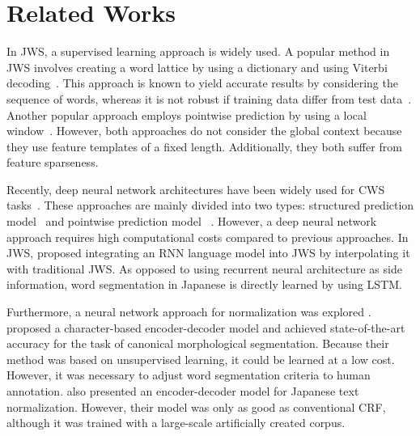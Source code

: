 \documentclass[11pt]{article}
\begin{document}
\section{Related Works}
\label{sec:relatedworks}
In JWS, a supervised learning approach is widely used. A popular method in JWS
involves creating a word lattice by using a dictionary and using Viterbi
decoding~\cite{kudo-yamamoto-matsumoto:2004:EMNLP,sassano2002empirical}. This
approach is known to yield accurate results by considering the sequence of
words, whereas it is not robust if training data differ from test
data~\cite{neubig-nakata-mori:2011:ACL-HLT2011}.
Another popular approach employs pointwise prediction by using a local
window~\cite{neubig-nakata-mori:2011:ACL-HLT2011,NEUBIG10.408}. However, both
approaches do not consider the global context because they use feature
templates of a fixed length. Additionally, they both suffer from feature
sparseness.

Recently, deep neural network architectures have been widely used for CWS
tasks~\cite{chen-EtAl:2015:EMNLP2,chen-EtAl:2015:ACL-IJCNLP5,pei-ge-chang:2014:P14-1,zhang-zhang-fu:2016:P16-1,cai-zhao:2016:P16-1}.
These approaches are mainly divided into two types: structured prediction
model~\cite{zhang-zhang-fu:2016:P16-1,cai-zhao:2016:P16-1} and pointwise prediction model ~\cite{chen-EtAl:2015:EMNLP2,chen-EtAl:2015:ACL-IJCNLP5,pei-ge-chang:2014:P14-1}. However, a deep neural network approach requires high computational costs compared to previous approaches. 
In JWS,  proposed integrating an
RNN language model into JWS by interpolating it with traditional JWS. As
opposed to using recurrent neural architecture as side information, word
segmentation in Japanese is directly learned by using LSTM.

Furthermore, a neural network approach for normalization was explored
\cite{kann-cotterell-schutze:2016:EMNLP2016,ikeda2016norm}.
 proposed a character-based
encoder-decoder model and achieved state-of-the-art accuracy for the task of
canonical morphological segmentation.
Because their method was based on unsupervised learning, it could be learned
at a low cost. However, it was necessary to adjust word segmentation
criteria to human annotation.
 also presented an encoder-decoder model for Japanese
text normalization. However, their model was only as good as conventional
CRF, although it was trained with a large-scale artificially created corpus.
\end{document}
